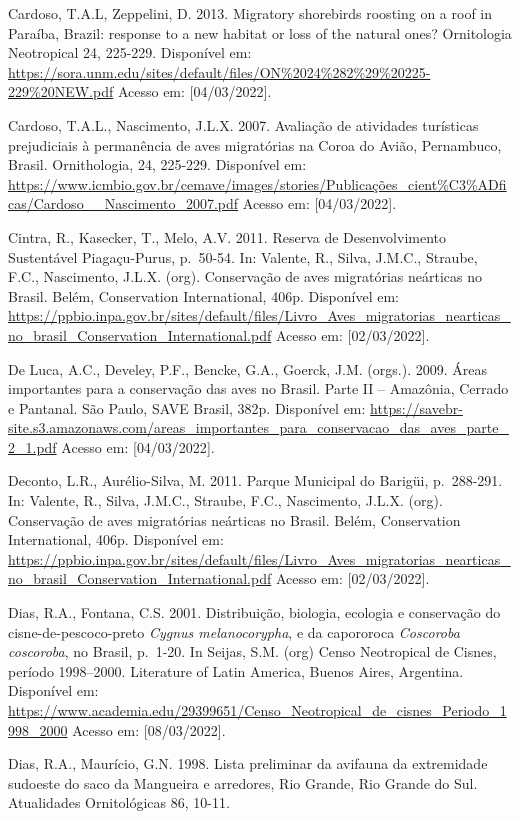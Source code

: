 \documentclass[
  oneside]{scrbook}
\begin{document}
Cardoso, T.A.L, Zeppelini, D. 2013. Migratory shorebirds roosting on a roof in Paraíba, Brazil: response to a new habitat or loss of the natural ones? Ornitologia Neotropical 24, 225-229. Disponível em: \url{https://sora.unm.edu/sites/default/files/ON\%2024\%282\%29\%20225-229\%20NEW.pdf} Acesso em: {[}04/03/2022{]}.

Cardoso, T.A.L., Nascimento, J.L.X. 2007. Avaliação de atividades turísticas prejudiciais à permanência de aves migratórias na Coroa do Avião, Pernambuco, Brasil. Ornithologia, 24, 225-229. Disponível em: \url{https://www.icmbio.gov.br/cemave/images/stories/Publicações_cient\%C3\%ADficas/Cardoso__Nascimento_2007.pdf} Acesso em: {[}04/03/2022{]}.

Cintra, R., Kasecker, T., Melo, A.V. 2011. Reserva de Desenvolvimento Sustentável Piagaçu-Purus, p.~50-54. In: Valente, R., Silva, J.M.C., Straube, F.C., Nascimento, J.L.X. (org). Conservação de aves migratórias neárticas no Brasil. Belém, Conservation International, 406p. Disponível em: \url{https://ppbio.inpa.gov.br/sites/default/files/Livro_Aves_migratorias_nearticas_no_brasil_Conservation_International.pdf} Acesso em: {[}02/03/2022{]}.

De Luca, A.C., Develey, P.F., Bencke, G.A., Goerck, J.M. (orgs.). 2009. Áreas importantes para a conservação das aves no Brasil. Parte II -- Amazônia, Cerrado e Pantanal. São Paulo, SAVE Brasil, 382p. Disponível em: \url{https://savebr-site.s3.amazonaws.com/areas_importantes_para_conservacao_das_aves_parte_2_1.pdf} Acesso em: {[}04/03/2022{]}.

Deconto, L.R., Aurélio-Silva, M. 2011. Parque Municipal do Barigüi, p.~288-291. In: Valente, R., Silva, J.M.C., Straube, F.C., Nascimento, J.L.X. (org). Conservação de aves migratórias neárticas no Brasil. Belém, Conservation International, 406p. Disponível em: \url{https://ppbio.inpa.gov.br/sites/default/files/Livro_Aves_migratorias_nearticas_no_brasil_Conservation_International.pdf} Acesso em: {[}02/03/2022{]}.

Dias, R.A., Fontana, C.S. 2001. Distribuição, biologia, ecologia e conservação do cisne-de-pescoco-preto \emph{Cygnus melanocorypha}, e da capororoca \emph{Coscoroba coscoroba}, no Brasil, p.~1-20. In Seijas, S.M. (org) Censo Neotropical de Cisnes, período 1998--2000. Literature of Latin America, Buenos Aires, Argentina. Disponível em: \url{https://www.academia.edu/29399651/Censo_Neotropical_de_cisnes_Periodo_1998_2000} Acesso em: {[}08/03/2022{]}.

Dias, R.A., Maurício, G.N. 1998. Lista preliminar da avifauna da extremidade sudoeste do saco da Mangueira e arredores, Rio Grande, Rio Grande do Sul. Atualidades Ornitológicas 86, 10-11.
\end{document}
